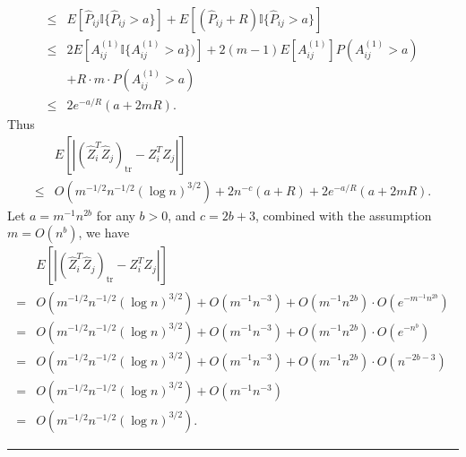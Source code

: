 \documentclass[a4paper]{article}
\newenvironment{proof}{{\bf Proof:  }}{\hfill\rule{2mm}{2mm}}
\renewcommand{\hat}{\widehat}
\begin{document}
\begin{proof}
\begin{align*}
	\le & E[\hat{P}_{ij} \mathbb{I}\{\hat{P}_{ij} > a\}] + E[(\hat{P}_{ij} + R) \mathbb{I}\{\hat{P}_{ij} > a\}] \\
	\le & 2 E[A_{ij}^{(1)} \mathbb{I} \{ A_{ij}^{(1)} > a \})] + 2(m-1) E[A_{ij}^{(1)}] P(A_{ij}^{(1)} > a) \\
	& + R \cdot m \cdot P(A_{ij}^{(1)} > a) \\
	\le & 2 e^{-a/R} (a + 2 m R).
\end{align*}
Thus
\begin{align*}
	& E[|(\hat{Z}_i^T \hat{Z}_j)_{\mathrm{tr}} - Z_i^T Z_j|] \\
	\le & O(m^{-1/2} n^{-1/2} (\log n)^{3/2}) + 2 n^{-c} (a + R) + 2 e^{-a/R} (a + 2 m R).
\end{align*}
Let $a = m^{-1} n^{2b}$ for any $b > 0$, and $c = 2b + 3$, combined with the assumption $m = O(n^{b})$, we have
\begin{align*}
	& E[|(\hat{Z}_i^T \hat{Z}_j)_{\mathrm{tr}} - Z_i^T Z_j|] \\
	= & O(m^{-1/2} n^{-1/2} (\log n)^{3/2}) + O(m^{-1} n^{-3}) + O(m^{-1} n^{2b}) \cdot O(e^{-m^{-1} n^{2b}}) \\
	= & O(m^{-1/2} n^{-1/2} (\log n)^{3/2}) + O(m^{-1} n^{-3}) + O(m^{-1} n^{2b}) \cdot O(e^{- n^{b}}) \\
	= & O(m^{-1/2} n^{-1/2} (\log n)^{3/2}) + O(m^{-1} n^{-3}) + O(m^{-1} n^{2b}) \cdot O(n^{-2b-3}) \\
	= & O(m^{-1/2} n^{-1/2} (\log n)^{3/2}) + O(m^{-1} n^{-3}) \\
	= & O(m^{-1/2} n^{-1/2} (\log n)^{3/2}).
\end{align*}
\end{proof}
\end{document}
